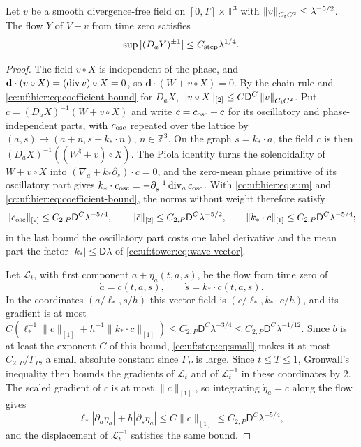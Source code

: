 \begin{lemma}\label{cc:uf:step:lem:flow-bounds}
Let $v$ be a smooth divergence-free field on $[0,T]\times\mathbb T^3$
with $\left\lVert v\right\rVert_{C_tC^2}\le\lambda^{-5/2}$. The flow $Y$ of $V+v$ from
time zero satisfies
\begin{equation}\label{cc:uf:step:eq:deformation}
 \sup|(D_aY)^{\pm1}|\le C_{\rm step}\lambda^{1/4}.
\end{equation}
\end{lemma}
\begin{proof}
The field $v\circ X$ is independent of the phase, and
$\mathbf d\cdot(v\circ X)=(\operatorname{div} v)\circ X=0$, so
$\widetilde{\mathbf d}\cdot(W+v\circ X)=0$. By the chain rule and
\eqref{cc:uf:hier:eq:coefficient-bound} for $D_aX$,
$\|v\circ X\|_{[2]}\le C\mathsf D^C\left\lVert v\right\rVert_{C_tC^2}$.
Put $c=(D_aX)^{-1}(W+v\circ X)$ and write $c=c_{\rm osc}+\bar c$ for its
oscillatory and phase-independent parts, with $c_{\rm osc}$ repeated over
the lattice by $(a,s)\mapsto(a+n,s+k_*\cdot n)$,
$n\in\mathbb Z^3$. On the graph $s=k_*\cdot a$, the field $c$ is then
$(D_aX)^{-1}((W^\natural+v)\circ X)$. The Piola identity turns the
solenoidality of $W+v\circ X$ into $(\nabla_a+k_*\partial_s)\cdot c=0$,
and the zero-mean phase primitive of its oscillatory part gives
$k_*\cdot c_{\rm osc}=-\partial_s^{-1}\operatorname{div}_a c_{\rm osc}$. With
\eqref{cc:uf:hier:eq:sum} and \eqref{cc:uf:hier:eq:coefficient-bound},
the norms without weight therefore satisfy
\[
 \|c_{\rm osc}\|_{[2]}\le C_{2,P}\mathsf D^C\lambda^{-5/4},\qquad
 \|\bar c\|_{[2]}\le C_{2,P}\mathsf D^C\lambda^{-5/2},\qquad
 \|k_*\cdot c\|_{[1]}\le C_{2,P}\mathsf D^C\lambda^{-5/4};
\]
in the last bound the oscillatory part costs one label derivative and
the mean part the factor $|k_*|\le\mathsf D\lambda$ of
\eqref{cc:uf:tower:eq:wave-vector}.

Let \(\mathscr L_t\), with first component \(a+\eta_a(t,a,s)\), be the
flow from time zero of
\begin{equation}\label{cc:uf:exact:eq:particle}
 \dot a=c(t,a,s),\qquad \dot s=k_*\cdot c(t,a,s).
\end{equation}
In the coordinates $(a/\ell_*,s/h)$ this vector field is
$(c/\ell_*,k_*\cdot c/h)$, and its gradient is at most
$C(\ell_*^{-1}\|c\|_{[1]}+h^{-1}\|k_*\cdot c\|_{[1]})
\le C_{2,P}\mathsf D^C\lambda^{-3/4}
\le C_{2,P}\mathsf D^C\lambda^{-1/12}$. Since $b$ is at least the
exponent $C$ of this bound, \eqref{cc:uf:step:eq:small} makes it at
most $C_{2,P}/\Gamma_P$, a small absolute constant since $\Gamma_P$ is
large.
Since $t\le T\le1$, Gronwall's inequality then bounds the
gradients of $\mathscr L_t$ and of $\mathscr L_t^{-1}$ in these
coordinates by $2$. The scaled gradient of $c$ is at most
$\|c\|_{[1]}$, so integrating $\dot\eta_a=c$ along the flow gives
\[
 \ell_*|\partial_a\eta_a|+h|\partial_s\eta_a|
 \le C\|c\|_{[1]}\le C_{2,P}\mathsf D^C\lambda^{-5/4},
\]
and the displacement of $\mathscr L_t^{-1}$ satisfies the same bound.


\end{proof}
